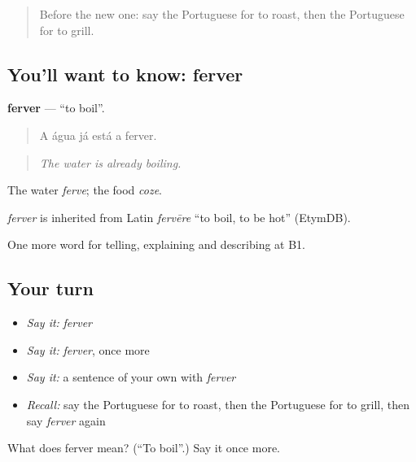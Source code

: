 \label{lesson:PT-C332-ferver}



\begin{quote}
Before the new one: say the Portuguese for to roast, then the Portuguese for to grill.
\end{quote}

\subsection*{You'll want to know: ferver}
\textbf{ferver} — \textquotedblleft{}to boil\textquotedblright{}.

\begin{quote}
A água já está a ferver.
\end{quote}

\begin{quote}
\emph{The water is already boiling.}
\end{quote}

The water \emph{ferve}; the food \emph{coze}.

\begin{cousinweb}
\emph{ferver} is inherited from Latin \emph{fervēre} \textquotedblleft{}to boil, to be hot\textquotedblright{} (EtymDB).
\end{cousinweb}

\begin{grammarlens}[title={What you've built}]
One more word for telling, explaining and describing at B1.
\end{grammarlens}

\subsection*{Your turn}
\begin{itemize}
\raggedright
  \item \emph{Say it:} \emph{ferver}
  \item \emph{Say it:} \emph{ferver}, once more
  \item \emph{Say it:} a sentence of your own with \emph{ferver}
  \item \emph{Recall:} say the Portuguese for to roast, then the Portuguese for to grill, then say \emph{ferver} again
\end{itemize}

\begin{tcolorbox}[breakable,colback=teal!4,colframe=teal!35!black,title={Before you move on}]
What does ferver mean? (\textquotedblleft{}To boil\textquotedblright{}.) Say it once more.
\end{tcolorbox}
